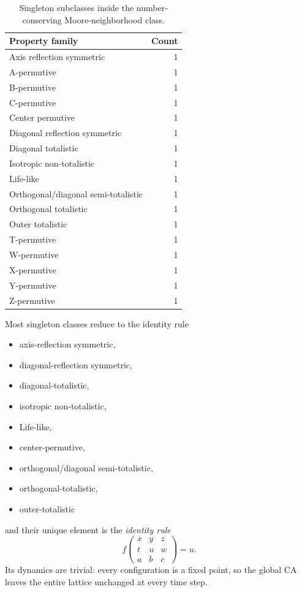 \documentclass[11pt,a4paper]{article}
\newcommand{\nbhd}[9]{%
  \begin{smallmatrix}
  #1 & #2 & #3 \\
  #4 & #5 & #6 \\
  #7 & #8 & #9
  \end{smallmatrix}
}
\newcommand{\F}[1]{f\!\left(#1\right)}
\begin{document}
\begin{table}[htbp]
\centering
\begin{tabular}{@{}lr@{}}
\toprule
Property family & Count \\
\midrule
Axis reflection symmetric & 1 \\
A-permutive & 1 \\
B-permutive & 1 \\
C-permutive & 1 \\
Center permutive & 1 \\
Diagonal reflection symmetric & 1 \\
Diagonal totalistic & 1 \\
Isotropic non-totalistic & 1 \\
Life-like & 1 \\
Orthogonal/diagonal semi-totalistic & 1 \\
Orthogonal totalistic & 1 \\
Outer totalistic & 1 \\
T-permutive & 1 \\
W-permutive & 1 \\
X-permutive & 1 \\
Y-permutive & 1 \\
Z-permutive & 1 \\
\bottomrule
\end{tabular}
\caption{Singleton subclasses inside the number-conserving Moore-neighborhood class.}
\label{tab:counts-one}
\end{table}

Most singleton classes reduce to the identity rule
\begin{itemize}
\item axis-reflection symmetric,
\item diagonal-reflection symmetric,
\item diagonal-totalistic,
\item isotropic non-totalistic,
\item Life-like,
\item center-permutive,
\item orthogonal/diagonal semi-totalistic,
\item orthogonal-totalistic,
\item outer-totalistic
\end{itemize}
and their unique element is the \emph{identity rule}
\[
\F{\nbhd{x}{y}{z}{t}{u}{w}{a}{b}{c}} = u.
\]
Its dynamics are trivial: every configuration is a fixed point, so the global CA leaves the
entire lattice unchanged at every time step.
\end{document}
